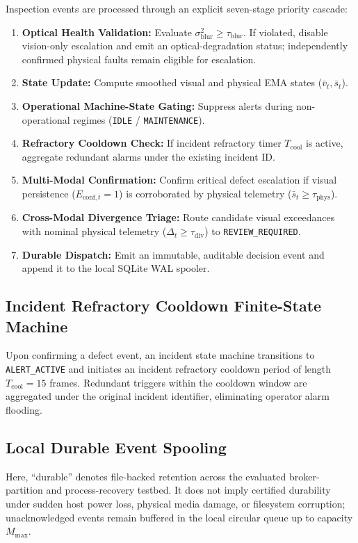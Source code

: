 \documentclass[conference]{IEEEtran}
\begin{document}
Inspection events are processed through an explicit seven-stage priority cascade:
\begin{enumerate}\setlength{\topsep}{1.5pt}\setlength{\itemsep}{0pt}\setlength{\parsep}{0pt}\setlength{\parskip}{0pt}
\item \textbf{Optical Health Validation:} Evaluate $\sigma_{\mathrm{blur}}^2 \ge \tau_{\mathrm{blur}}$. If violated, disable vision-only escalation and emit an optical-degradation status; independently confirmed physical faults remain eligible for escalation.
    \item \textbf{State Update:} Compute smoothed visual and physical EMA states ($\bar{v}_t, \bar{s}_t$).
    \item \textbf{Operational Machine-State Gating:} Suppress alerts during non-operational regimes (\texttt{IDLE} / \texttt{MAINTENANCE}).
    \item \textbf{Refractory Cooldown Check:} If incident refractory timer $T_{\mathrm{cool}}$ is active, aggregate redundant alarms under the existing incident ID.
    \item \textbf{Multi-Modal Confirmation:} Confirm critical defect escalation if visual persistence ($E_{\mathrm{conf}, t} = 1$) is corroborated by physical telemetry ($\bar{s}_t \ge \tau_{\mathrm{phys}}$).
    \item \textbf{Cross-Modal Divergence Triage:} Route candidate visual exceedances with nominal physical telemetry ($\Delta_t \ge \tau_{\mathrm{div}}$) to \texttt{REVIEW\_REQUIRED}.
    \item \textbf{Durable Dispatch:} Emit an immutable, auditable decision event and append it to the local SQLite WAL spooler.
\end{enumerate}

\subsection{Incident Refractory Cooldown Finite-State Machine}
Upon confirming a defect event, an incident state machine transitions to \texttt{ALERT\_ACTIVE} and initiates an incident refractory cooldown period of length $T_{\mathrm{cool}} = 15$ frames. Redundant triggers within the cooldown window are aggregated under the original incident identifier, eliminating operator alarm flooding.

\subsection{Local Durable Event Spooling}
Here, ``durable'' denotes file-backed retention across the evaluated broker-partition and process-recovery testbed. It does not imply certified durability under sudden host power loss, physical media damage, or filesystem corruption; unacknowledged events remain buffered in the local circular queue up to capacity $M_{\mathrm{max}}$.
\end{document}
